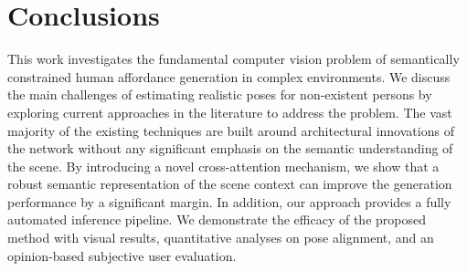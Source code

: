\section{Conclusions}
\label{sec:conclusions}

This work investigates the fundamental computer vision problem of semantically constrained human affordance generation in complex environments. We discuss the main challenges of estimating realistic poses for non-existent persons by exploring current approaches in the literature to address the problem. The vast majority of the existing techniques are built around architectural innovations of the network without any significant emphasis on the semantic understanding of the scene. By introducing a novel cross-attention mechanism, we show that a robust semantic representation of the scene context can improve the generation performance by a significant margin. In addition, our approach provides a fully automated inference pipeline. We demonstrate the efficacy of the proposed method with visual results, quantitative analyses on pose alignment, and an opinion-based subjective user evaluation.

\vspace{1.0em}


